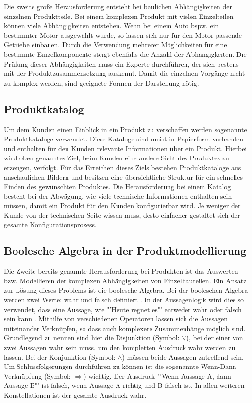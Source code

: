 Die zweite große Herausforderung entsteht bei baulichen Abhängigkeiten der einzelnen Produktteile. Bei einem komplexen Produkt mit vielen Einzelteilen können viele Abhängigkeiten entstehen. Wenn bei einem Auto bspw. ein bestimmter Motor ausgewählt wurde, so lassen sich nur für den Motor passende Getriebe einbauen. Durch die Verwendung mehrerer Möglichkeiten für eine bestimmte Einzelkomponente steigt ebenfalls die Anzahl der Abhängigkeiten. Die Prüfung dieser Abhängigkeiten muss ein Experte durchführen, der sich bestens mit der Produktzusammensetzung auskennt. Damit die einzelnen Vorgänge nicht zu komplex werden, sind geeignete Formen der Darstellung nötig.

\subsection{Produktkatalog}
Um dem Kunden einen Einblick in ein Produkt zu verschaffen werden sogenannte Produktkataloge verwendet. Diese Kataloge sind meist in Papierform vorhanden und enthalten für den Kunden relevante Informationen über ein Produkt.  Hierbei wird oben genanntes Ziel, beim Kunden eine andere Sicht des Produktes zu erzeugen, verfolgt. Für das Erreichen dieses Ziels bestehen Produktkataloge aus anschaulichen Bildern und besitzen eine übersichtliche Struktur für ein schnelles Finden des gewünschten Produktes. Die Herausforderung bei einem Katalog besteht bei der Abwägung, wie viele technische Informationen enthalten sein müssen, damit ein Produkt für den Kunden konfigurierbar wird. Je weniger der Kunde von der technischen Seite wissen muss, desto einfacher gestaltet sich der gesamte Konfigurationsprozess.  


\subsection{Boolesche Algebra in der Produktmodellierung}
Die Zweite bereits genannte Herausforderung bei Produkten ist das Auswerten bzw. Modellieren der  komplexen Abhängigkeiten von Einzelbauteilen.  Ein Ansatz zur Lösung dieses Problems ist die boolesche Algebra. Bei der booleschen Algebra werden zwei Werte: wahr und falsch definiert \cite{bib:boolescheAlgebra1}. In der Aussagenlogik wird dies so verwendet, dass eine Aussage, wie "'Heute regnet es"' entweder wahr oder falsch sein kann \cite{bib:boolescheAlgebra2}. Mithilfe von verschiedenen Operatoren lassen sich die Aussagen miteinander Verknüpfen, so dass auch komplexere Zusammenhänge möglich sind. Grundlegend zu nennen sind hier die Disjunktion (Symbol: $\vee$), bei der einer von zwei Aussagen wahr sein muss, um den kompletten Ausdruck wahr werden zu lassen. Bei der Konjunktion (Symbol: $\wedge$) müssen beide Aussagen zutreffend sein. Um Schlussfolgerungen durchführen zu können ist die sogenannte Wenn-Dann Verknüpfung (Symbol: $\Rightarrow$) wichtig. Der Ausdruck "'Wenn Aussage A, dann Aussage B"' ist falsch, wenn Aussage A richtig und B falsch ist. In allen weiteren Konstellationen ist der gesamte Ausdruck wahr. 
\par

